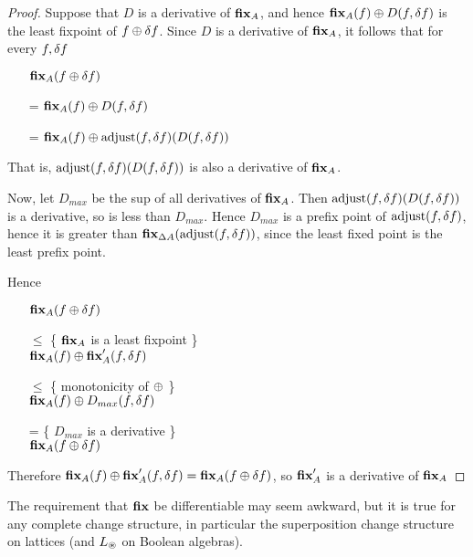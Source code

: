 \begin{proof}
  Suppose that $D$ is a derivative of $\textbf{fix}_A$, and hence $\textbf{fix}_A(f) \oplus D(f,
  \delta f)$ is the least fixpoint of $f \oplus \delta f$. 
  Since $D$ is a derivative of $\textbf{fix}_A$, it follows that for every $f, \delta f$
  \begin{itemize}
    \item[ ]$\textbf{fix}_A (f \oplus \delta f)$
    \item[=]$\textbf{fix}_A(f) \oplus D(f, \delta f)$
    \item[=]$\textbf{fix}_A(f) \oplus \operatorname{adjust}(f, \delta f)(D(f, \delta f))$
  \end{itemize}

  That is, $\operatorname{adjust}(f, \delta f)(D(f, \delta f))$ is also a
  derivative of $\textbf{fix}_A$.

  Now, let $D_{max}$ be the sup of all derivatives of $\textbf{fix}_A$. Then
  $\operatorname{adjust}(f, \delta f)(D(f, \delta f))$ is a
  derivative, so is less than $D_{max}$. Hence $D_{max}$ is a prefix point of
  $\operatorname{adjust}(f, \delta f)$, hence it is greater than
  $\textbf{fix}_{\Delta A}(\operatorname{adjust}(f, \delta f))$, since the least fixed point is the least prefix
  point.

  Hence 
  \begin{itemize}
    \item[ ]
      $\textbf{fix}_A(f \oplus \delta f)$
    \item[$\leq$]\{ $\textbf{fix}_A$ is a least fixpoint \}\\
      $\textbf{fix}_A(f) \oplus \textbf{fix}_A'(f, \delta f)$
    \item[$\leq$]\{ monotonicity of $\oplus$ \}\\
      $\textbf{fix}_A(f) \oplus D_{max}(f, \delta f)$
    \item[=]\{ $D_{max}$ is a derivative \}\\
      $\textbf{fix}_A(f \oplus \delta f)$
  \end{itemize}

  Therefore $\textbf{fix}_A(f) \oplus \textbf{fix}_A'(f, \delta f) =
  \textbf{fix}_A(f \oplus \delta f)$, so $\textbf{fix}_A'$ is a derivative of $\textbf{fix}_A$
\end{proof}

The requirement that $\textbf{fix}$ be differentiable may seem awkward, but it is
true for any complete change structure, in particular the superposition change
structure on lattices (and $L_\circledast$ on Boolean algebras).

